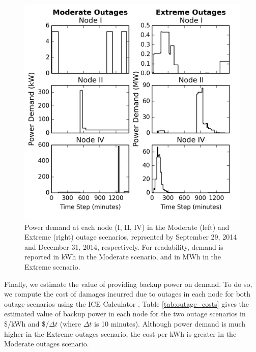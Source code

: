 \documentclass[journal]{IEEEtran}
\begin{document}
\begin{figure}[!htbp]
  \includegraphics[width=0.8\linewidth]{plots/power_demand.png}
  \caption{Power demand at each node (I, II, IV) in the Moderate (left) and Extreme (right) outage scenarios, reprsented by September 29, 2014 and December 31, 2014, respectively. For readability, demand is reported in kWh in the Moderate scenario, and in MWh in the Extreme scenario.}
  \label{fig:power_demand}
\end{figure}

Finally, we estimate the value of providing backup power on demand. To do so, we compute the cost of damages incurred due to outages in each node for both outage scenarios using the ICE Calculator \cite{ice_calculator_2015}. Table \ref{tab:outage_costs} gives the estimated value of backup power in each node for the two outage scenarios in \$/kWh and \$/$\Delta t$ (where $\Delta t$ is 10 minutes). Although power demand is much higher in the Extreme outages scenario, the cost per kWh is greater in the Moderate outages scenario.
\end{document}
